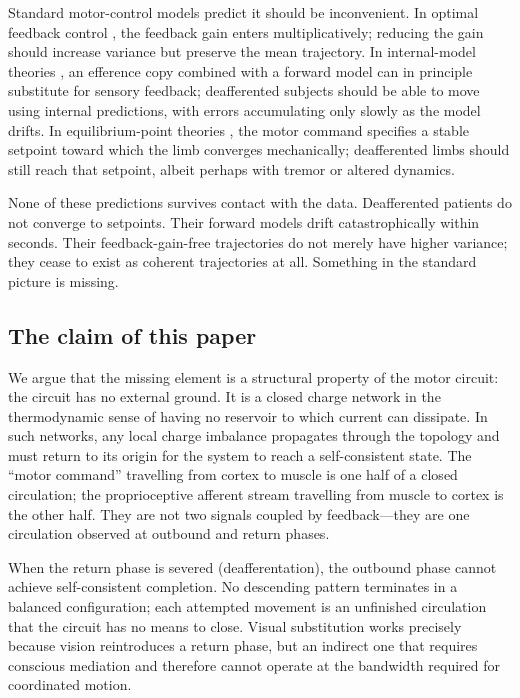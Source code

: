 \documentclass[11pt,twocolumn,a4paper]{article}
\theoremstyle{definition}
\theoremstyle{remark}
\begin{document}
Standard motor-control models predict it should be inconvenient. In
optimal feedback control \citep{todorov2002}, the feedback gain
enters multiplicatively; reducing the gain should increase variance
but preserve the mean trajectory. In internal-model theories
\citep{kawato1999,wolpert2000}, an efference copy combined with a
forward model can in principle substitute for sensory feedback;
deafferented subjects should be able to move using internal
predictions, with errors accumulating only slowly as the model drifts.
In equilibrium-point theories \citep{feldman1966,feldman1986,%
bizzi1992}, the motor command specifies a stable setpoint toward which
the limb converges mechanically; deafferented limbs should still reach
that setpoint, albeit perhaps with tremor or altered dynamics.

None of these predictions survives contact with the data. Deafferented
patients do not converge to setpoints. Their forward models drift
catastrophically within seconds. Their feedback-gain-free trajectories
do not merely have higher variance; they cease to exist as coherent
trajectories at all. Something in the standard picture is missing.

\subsection{The claim of this paper}

We argue that the missing element is a structural property of the
motor circuit: the circuit has no external ground. It is a closed
charge network in the thermodynamic sense of having no reservoir to
which current can dissipate. In such networks, any local charge
imbalance propagates through the topology and must return to its
origin for the system to reach a self-consistent state. The ``motor
command'' travelling from cortex to muscle is one half of a closed
circulation; the proprioceptive afferent stream travelling from muscle
to cortex is the other half. They are not two signals coupled by
feedback---they are one circulation observed at outbound and return
phases.

When the return phase is severed (deafferentation), the outbound phase
cannot achieve self-consistent completion. No descending pattern
terminates in a balanced configuration; each attempted movement is an
unfinished circulation that the circuit has no means to close. Visual
substitution works precisely because vision reintroduces a return
phase, but an indirect one that requires conscious mediation and
therefore cannot operate at the bandwidth required for coordinated
motion.
\end{document}
